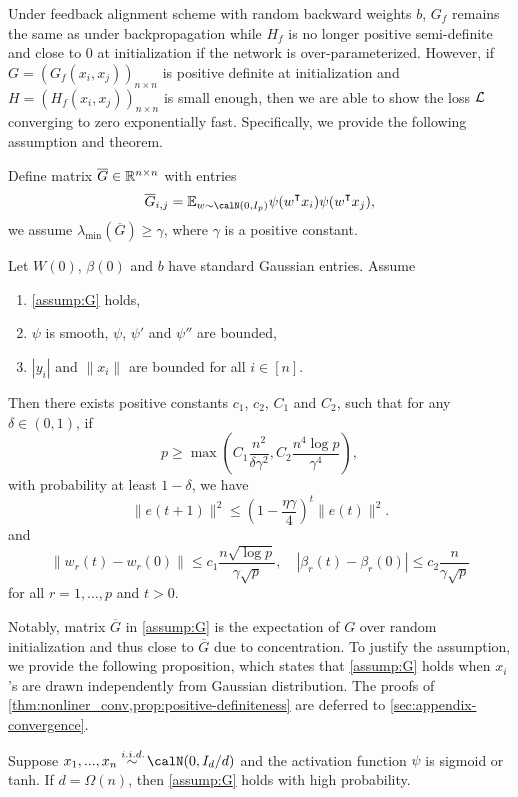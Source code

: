 Under feedback alignment scheme with random backward weights $b$, $G_f$ remains the same as under backpropagation while $H_f$ is no longer positive semi-definite and close to $0$ at initialization if the network is over-parameterized. However, if $G = (G_f(x_i,x_j))_{n\times n}$ is positive definite at initialization and $H = (H_f(x_i,x_j))_{n\times n}$ is small enough, then we are able to show the loss $\mathcal{L}$ converging to zero exponentially fast. Specifically, we provide the following assumption and theorem.

\begin{assumption}\label{assump:G}
Define matrix $\overline{G} \in \mathbb{R}^{n\times n}$ with entries
\begin{equation*}
    \overline{G}_{i,j} = \E_{w\sim \calN(0,I_p)}\psi(w\transpose x_i) \psi(w\transpose  x_j),
\end{equation*}
we assume $\lambda_{\min}(\overline{G}) \geq \gamma$, where $\gamma$ is a positive constant.
\end{assumption}

\begin{theorem}\label{thm:nonliner_conv}
Let $W(0)$, $\beta(0)$ and $b$ have \iid standard Gaussian entries. Assume
\begin{enumerate}
    \item \cref{assump:G} holds,
    \item $\psi$ is smooth, $\psi$, $\psi'$ and $\psi''$ are bounded,
    \item $|y_i|$ and $\|x_i\|$ are bounded for all $i\in[n]$.
\end{enumerate}
Then there exists positive constants $c_1$, $c_2$, $C_1$ and $C_2$, such that for any $\delta\in(0,1)$, if 
\begin{equation*}
    p \geq \max(C_1\frac{n^2}{\delta\gamma^2}, C_2\frac{n^4\log p}{\gamma^4}),
\end{equation*}
with probability at least $1-\delta$, we have
\begin{equation}\label{eq:conv}
    \|e(t+1)\|^2 \leq (1-\frac{\eta\gamma}{4})^t\|e(t)\|^2.
\end{equation}
and 
\begin{equation}
\label{eq:weights}
    \|w_r(t)-w_r(0)\| \leq c_1\frac{n\sqrt{\log p}}{\gamma\sqrt p}, \quad |\beta_r(t)-\beta_r(0)| \leq c_2\frac{n}{\gamma\sqrt p}
\end{equation}
for all $r=1,\ldots, p$ and $t>0$.
\end{theorem}

Notably, matrix $\overline{G}$ in \cref{assump:G} is the expectation of $G$ over random initialization and thus close to $\overline{G}$ due to concentration. To justify the assumption, we provide the following proposition, which states that \cref{assump:G} holds when $x_i$'s are drawn independently from Gaussian distribution. The proofs of \cref{thm:nonliner_conv,prop:positive-definiteness} are deferred to \cref{sec:appendix-convergence}.

\begin{proposition}\label{prop:positive-definiteness}
Suppose $x_1,...,x_n \overset{\iid}{\sim} \calN(0,I_d/d)$ and the activation function $\psi$ is sigmoid or tanh. If $d=\Omega(n)$, then \cref{assump:G} holds with high probability.
\end{proposition}




